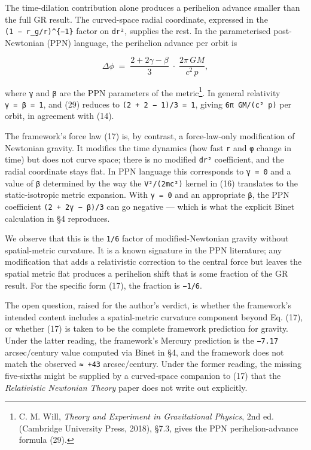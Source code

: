 \documentclass[
  11pt,
]{article}
\begin{document}
The time-dilation contribution alone produces a perihelion advance
smaller than the full GR result. The curved-space radial coordinate,
expressed in the \texttt{(1\ −\ r\_g/r)\^{}\{−1\}} factor on
\texttt{dr²}, supplies the rest. In the parameterised post-Newtonian
(PPN) language, the perihelion advance per orbit is

\[
\Delta\phi \;=\; \frac{2 + 2\gamma - \beta}{3}\;\cdot\;\frac{2\pi\,GM}{c^{2}\,p}, \tag{29}
\]

where \texttt{γ} and \texttt{β} are the PPN parameters of the
metric\footnote{C. M. Will, \emph{Theory and Experiment in Gravitational
  Physics}, 2nd ed. (Cambridge University Press, 2018), §7.3, gives the
  PPN perihelion-advance formula (29).}. In general relativity
\texttt{γ\ =\ β\ =\ 1}, and (29) reduces to
\texttt{(2\ +\ 2\ −\ 1)/3\ =\ 1}, giving \texttt{6π\ GM/(c²\ p)} per
orbit, in agreement with (14).

The framework's force law (17) is, by contrast, a force-law-only
modification of Newtonian gravity. It modifies the time dynamics (how
fast \texttt{r} and \texttt{φ} change in time) but does not curve space;
there is no modified \texttt{dr²} coefficient, and the radial coordinate
stays flat. In PPN language this corresponds to \texttt{γ\ =\ 0} and a
value of \texttt{β} determined by the way the \texttt{V²/(2mc²)} kernel
in (16) translates to the static-isotropic metric expansion. With
\texttt{γ\ =\ 0} and an appropriate \texttt{β}, the PPN coefficient
\texttt{(2\ +\ 2γ\ −\ β)/3} can go negative --- which is what the
explicit Binet calculation in §4 reproduces.

We observe that this is the \texttt{1/6} factor of modified-Newtonian
gravity without spatial-metric curvature. It is a known signature in the
PPN literature; any modification that adds a relativistic correction to
the central force but leaves the spatial metric flat produces a
perihelion shift that is some fraction of the GR result. For the
specific form (17), the fraction is \texttt{−1/6}.

The open question, raised for the author's verdict, is whether the
framework's intended content includes a spatial-metric curvature
component beyond Eq. (17), or whether (17) is taken to be the complete
framework prediction for gravity. Under the latter reading, the
framework's Mercury prediction is the \texttt{−7.17} arcsec/century
value computed via Binet in §4, and the framework does not match the
observed \texttt{≈\ +43} arcsec/century. Under the former reading, the
missing five-sixths might be supplied by a curved-space companion to
(17) that the \emph{Relativistic Newtonian Theory} paper does not write
out explicitly.
\end{document}
